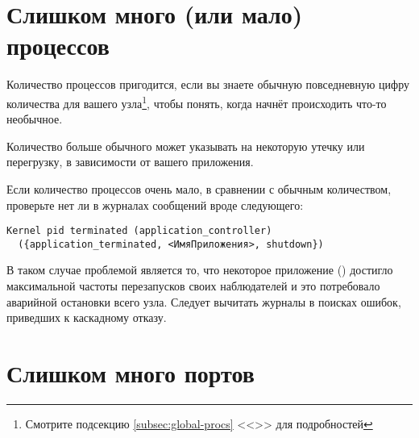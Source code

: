 \documentclass[11pt, oneside]{book}   	%
\newcommand\NamedRef[1]{\ref{#1} <<\nameref{#1}>>}
\begin{document}
\section{Слишком много (или мало) процессов}

Количество процессов пригодится, если вы знаете обычную повседневную цифру количества для вашего узла\footnote{Смотрите подсекцию \NamedRef{subsec:global-procs} для подробностей}, чтобы понять, когда начнёт происходить что-то необычное.

Количество больше обычного может указывать на некоторую утечку или перегрузку, в зависимости от вашего приложения.

Если количество процессов очень мало, в сравнении с обычным количеством, проверьте нет ли в журналах сообщений вроде следующего:

\begin{Verbatim}
Kernel pid terminated (application_controller)
  ({application_terminated, <ИмяПриложения>, shutdown})
\end{Verbatim}

В таком случае проблемой является то, что некоторое приложение () достигло максимальной частоты перезапусков своих наблюдателей и это потребовало аварийной остановки всего узла. Следует вычитать журналы в поисках ошибок, приведших к каскадному отказу.


\section{Слишком много портов}
\end{document}
